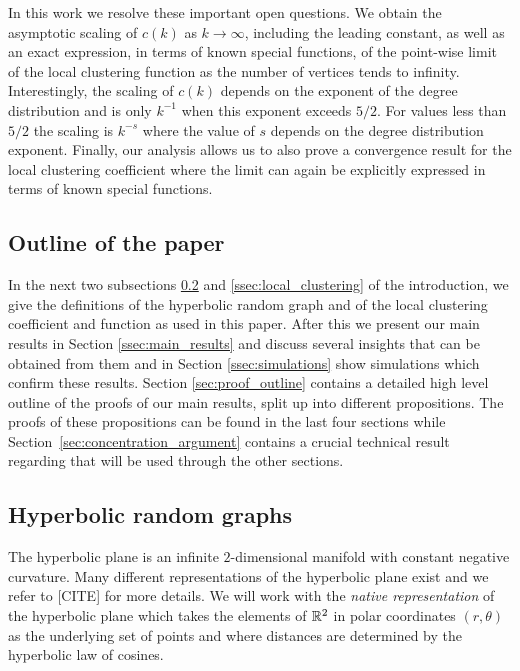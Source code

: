 In this work we resolve these important open questions. We obtain the asymptotic scaling of $c(k)$ as $k \to \infty$, including the leading constant, as well as an exact expression, in terms of known special functions, of the point-wise limit of the local clustering function as the number of vertices tends to infinity. Interestingly, the scaling of $c(k)$ depends on the exponent of the degree distribution and is only $k^{-1}$ when this exponent exceeds $5/2$. For values less than $5/2$ the scaling is $k^{-s}$ where the value of $s$ depends on the degree distribution exponent. Finally, our analysis allows us to also prove a convergence result for the local clustering coefficient where the limit can again be explicitly expressed in terms of known special functions. 


\subsection{Outline of the paper}

In the next two subsections \ref{ssec:hyperbolic_model} and \ref{ssec:local_clustering} of the introduction, we give the definitions of the hyperbolic random graph and of the local clustering coefficient and function as used in this paper. After this we present our main results in Section \ref{ssec:main_results} and discuss several insights that can be obtained from them and in Section \ref{ssec:simulations} show simulations which confirm these results. Section \ref{sec:proof_outline} contains a detailed high level outline of the proofs of our main results, split up into different propositions. The proofs of these propositions can be found in the last four sections while Section~\ref{sec:concentration_argument} contains a crucial technical result regarding that will be used through the other sections. 

\subsection{Hyperbolic random graphs}\label{ssec:hyperbolic_model}

The hyperbolic plane is an infinite $2$-dimensional manifold with constant negative curvature. Many different representations of the hyperbolic plane exist and we refer to [CITE] for more details.  We will work with the \emph{native representation} of the hyperbolic plane which takes the elements of ${\mathbb R}^2$ in polar coordinates $(r,\theta)$ as the underlying set of points and where distances are determined by the hyperbolic law of cosines.

